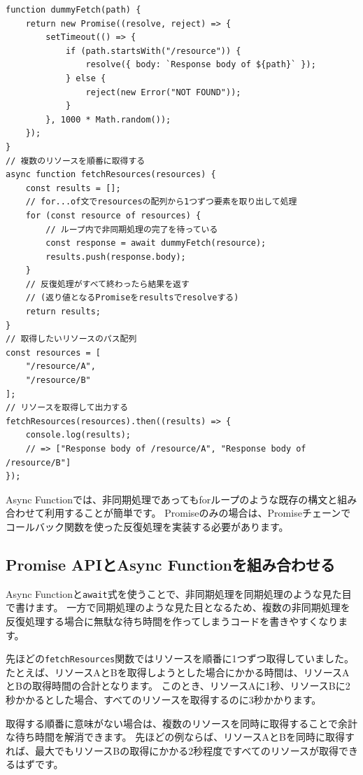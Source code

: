 \begin{lstlisting}
function dummyFetch(path) {
    return new Promise((resolve, reject) => {
        setTimeout(() => {
            if (path.startsWith("/resource")) {
                resolve({ body: `Response body of ${path}` });
            } else {
                reject(new Error("NOT FOUND"));
            }
        }, 1000 * Math.random());
    });
}
// 複数のリソースを順番に取得する
async function fetchResources(resources) {
    const results = [];
    // for...of文でresourcesの配列から1つずつ要素を取り出して処理
    for (const resource of resources) {
        // ループ内で非同期処理の完了を待っている
        const response = await dummyFetch(resource);
        results.push(response.body);
    }
    // 反復処理がすべて終わったら結果を返す
    // (返り値となるPromiseをresultsでresolveする)
    return results;
}
// 取得したいリソースのパス配列
const resources = [
    "/resource/A",
    "/resource/B"
];
// リソースを取得して出力する
fetchResources(resources).then((results) => {
    console.log(results); 
    // => ["Response body of /resource/A", "Response body of /resource/B"]
});
\end{lstlisting}

Async
Functionでは、非同期処理であってもforループのような既存の構文と組み合わせて利用することが簡単です。
Promiseのみの場合は、Promiseチェーンでコールバック関数を使った反復処理を実装する必要があります。

\hypertarget{relationship-promise-async-function}{%
\subsection{Promise APIとAsync
Functionを組み合わせる}\label{relationship-promise-async-function}}

Async
Functionと\texttt{await}式を使うことで、非同期処理を同期処理のような見た目で書けます。
一方で同期処理のような見た目となるため、複数の非同期処理を反復処理する場合に無駄な待ち時間を作ってしまうコードを書きやすくなります。

先ほどの\texttt{fetchResources}関数ではリソースを順番に1つずつ取得していました。
たとえば、リソースAとBを取得しようとした場合にかかる時間は、リソースAとBの取得時間の合計となります。
このとき、リソースAに1秒、リソースBに2秒かかるとした場合、すべてのリソースを取得するのに3秒かかります。

取得する順番に意味がない場合は、複数のリソースを同時に取得することで余計な待ち時間を解消できます。
先ほどの例ならば、リソースAとBを同時に取得すれば、最大でもリソースBの取得にかかる2秒程度ですべてのリソースが取得できるはずです。

